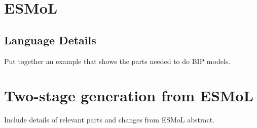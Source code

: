 \section{ESMoL}

\subsection{Language Details}


Put together an example that shows the parts needed to do BIP models.


\section{Two-stage generation from ESMoL}

Include details of relevant parts and changes from ESMoL abstract.